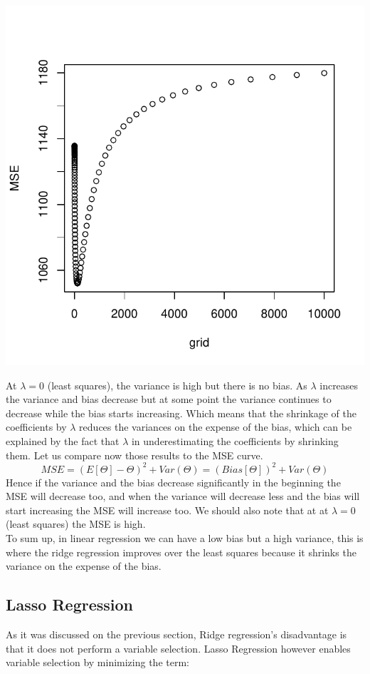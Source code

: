 \documentclass[]{report}
\begin{document}
\begin{center}
	\includegraphics[width=0.8\linewidth]{Figures/ridge_mse.pdf}
\end{center}

At $\lambda=0$ (least squares), the variance is high but there is no bias.
As $\lambda$ increases the variance and bias decrease but at some point the variance continues to decrease while the bias starts increasing. Which means that the shrinkage of the coefficients by $\lambda$ reduces the variances on the expense of the bias, which can be explained by the fact that $\lambda$ in underestimating the coefficients by shrinking them. Let us compare now those results to the MSE curve. 
$$MSE = (E[\varTheta]-\varTheta)^{2} + Var(\varTheta) = (Bias[\varTheta])^{2} + Var(\varTheta)$$
Hence if the variance and the bias decrease significantly in the beginning the MSE will decrease too, and when the variance will decrease less and the bias will start increasing the MSE will increase too. We should also note that at at  $\lambda=0$ (least squares) the MSE is high.\\
To sum up, in linear regression we can have a low bias but a high variance, this is where the ridge regression improves over the least squares because it shrinks the variance on the expense of the bias.
  
\subsection{Lasso Regression}
As it was discussed on the previous section, Ridge regression's disadvantage is that it does not perform a variable selection. Lasso Regression however enables variable selection by minimizing the term:
\end{document}
